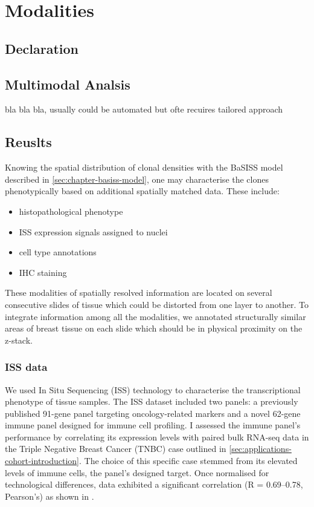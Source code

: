 \chapter{Modalities}
\label{sec:chapter-basiss-multimodal}

\section*{Declaration}

\section{Multimodal Analsis}

bla bla bla, usually could be automated but ofte recuires tailored approach



\section{Reuslts}

Knowing the spatial distribution of clonal densities with the BaSISS model described in \cref{sec:chapter-basiss-model}, one may characterise the clones phenotypically based on additional spatially matched data. These include:

\begin{itemize}
    \item histopathological phenotype
    \item \ac{ISS} expression signals assigned to nuclei
    \item cell type annotations
    \item IHC staining
\end{itemize}

These modalities of spatially resolved information are located on several consecutive slides of tissue which could be distorted from one layer to another. To integrate information among all the modalities, we annotated structurally similar areas of breast tissue on each slide which should be in physical proximity on the z-stack. 

\subsection{\acl{ISS} data}

We used In Situ Sequencing (\ac{ISS}) technology to characterise the transcriptional phenotype of tissue samples. The \ac{ISS} dataset included two panels: a previously published 91-gene panel targeting oncology-related markers and a novel 62-gene immune panel designed for immune cell profiling. I assessed the immune panel's performance by correlating its expression levels with paired bulk RNA-seq data in the Triple Negative Breast Cancer (TNBC) case outlined in \cref{sec:applications-cohort-introduction}. The choice of this specific case stemmed from its elevated levels of immune cells, the panel's designed target. Once normalised for technological differences, data exhibited a significant correlation (R = 0.69–0.78, Pearson's) as shown in .

